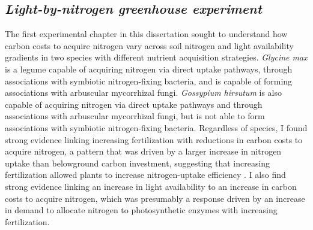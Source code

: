 \subsection{\textit{Light-by-nitrogen greenhouse experiment}}
\noindent The first experimental chapter in this dissertation sought to understand how carbon costs to acquire nitrogen vary across soil nitrogen and light availability gradients in two species with different nutrient acquisition strategies. \textit{Glycine max} is a legume capable of acquiring nitrogen via direct uptake pathways, through associations with symbiotic nitrogen-fixing bacteria, and is capable of forming associations with arbuscular mycorrhizal fungi. \textit{Gossypium hirsutum} is also capable of acquiring nitrogen via direct uptake pathways and through associations with arbuscular mycorrhizal fungi, but is not able to form associations with symbiotic nitrogen-fixing bacteria. Regardless of species, I found strong evidence linking increasing fertilization with reductions in carbon costs to acquire nitrogen, a pattern that was driven by a larger increase in nitrogen uptake than belowground carbon investment, suggesting that increasing fertilization allowed plants to increase nitrogen-uptake efficiency . I also find strong evidence linking an increase in light availability to an increase in carbon costs to acquire nitrogen, which was presumably a response driven by an increase in demand to allocate nitrogen to photosynthetic enzymes with increasing fertilization.

